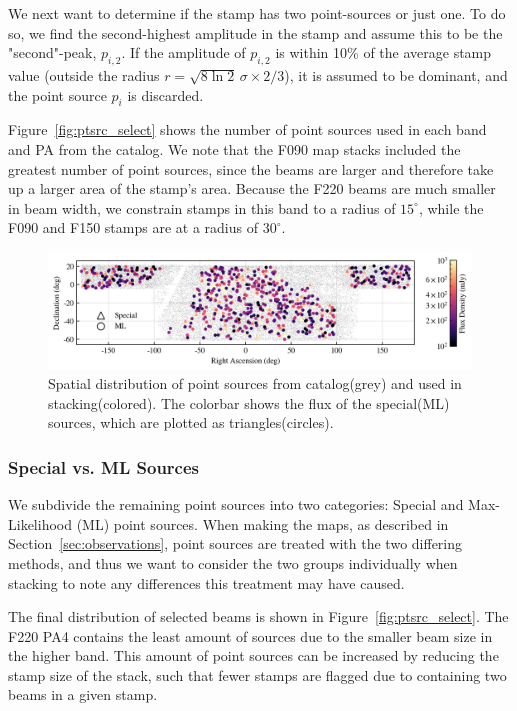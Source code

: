 We next want to determine if the stamp has two point-sources or just one.  To do so, we find the second-highest amplitude in the stamp and assume this to be the "second"-peak, $p_{i,2}$.  If the amplitude of $p_{i,2}$ is within 10\% of the average stamp value (outside the radius $r=\sqrt{8\ln{2}}\,\sigma\times 2/3$), it is assumed to be dominant, and the point source $p_i$ is discarded.

Figure~\ref{fig:ptsrc_select} shows the number of point sources used in each band and PA from the catalog.  We note that the F090 map stacks included the greatest number of point sources, since the beams are larger and therefore take up a larger area of the stamp's area.  Because the F220 beams are much smaller in beam width, we constrain stamps in this band to a radius of $15^{\circ}$, while the F090 and F150 stamps are at a radius of $30^{\circ}$.

\begin{figure}
    \centering
    \includegraphics[width = \textwidth]{Figures/ptsrc_map.png}
    \caption{Spatial distribution of point sources from catalog(grey) and used in stacking(colored).  The colorbar shows the flux of the special(ML) sources, which are plotted as triangles(circles).}
    \label{fig:ptsrc_map}
\end{figure}
\subsubsection{Special vs. ML Sources}
\label{subsubsec:type_sel}
We subdivide the remaining point sources into two categories: Special and Max-Likelihood (ML) point sources.  When making the maps, as described in Section~\ref{sec:observations}, point sources are treated with the two differing methods, and thus we want to consider the two groups individually when stacking to note any differences this treatment may have caused.

The final distribution of selected beams is shown in Figure~\ref{fig:ptsrc_select}.  The F220 PA4 contains the least amount of sources due to the smaller beam size in the higher band.  This amount of point sources can be increased by reducing the stamp size of the stack, such that fewer stamps are flagged due to containing two beams in a given stamp.

